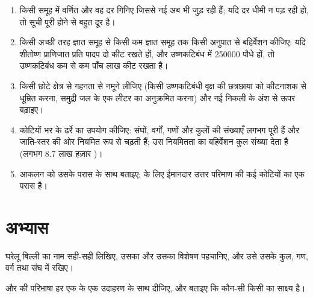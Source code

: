 \begin{method}\label{met:b1:classifying-biodiversity:estimate}
\begin{enumerate}
  \item किसी समूह में वर्णित  और वह दर गिनिए जिससे नई अब भी जुड़
        रही हैं; यदि दर धीमी न पड़ रही हो, तो सूची पूरी होने से बहुत
        दूर है।
  \item किसी अच्छी तरह ज्ञात समूह से किसी कम ज्ञात समूह तक किसी अनुपात
        से बहिर्वेशन कीजिए: यदि शीतोष्ण प्राणिजात प्रति पादप  दो
        कीट  रखते हों, और उष्णकटिबंध में \num{250000} पौधे हों,
        तो उष्णकटिबंध कम से कम पाँच लाख कीट रखता है।
  \item किसी छोटे क्षेत्र से गहनता से नमूने लीजिए (किसी उष्णकटिबंधी
        वृक्ष की छत्रछाया को कीटनाशक से धूम्रित करना, समुद्री जल के एक
        लीटर का  अनुक्रमित करना) और नई निकली  के अंश से ऊपर
        बढ़ाइए।
  \item कोटियों भर के ढर्रे का उपयोग कीजिए: संघों, वर्गों, गणों और कुलों
        की संख्याएँ लगभग पूरी हैं और जाति-स्तर की ओर नियमित रूप से
        चढ़ती हैं; उस नियमितता का बहिर्वेशन कुल संख्या देता है (लगभग
        \num{8.7} लाख हज़ार )।
  \item आकलन को उसके परास के साथ बताइए;  के लिए ईमानदार
        उत्तर परिमाण की कई कोटियों का एक परास है।
\end{enumerate}
\end{method}

\section{अभ्यास}

\begin{exercise}[$\star$]\label{exo:b1:classifying-biodiversity:1}
घरेलू बिल्ली का नाम सही-सही लिखिए, उसका  और उसका विशेषण पहचानिए, और
उसे उसके कुल, गण, वर्ग तथा संघ में रखिए।
\end{exercise}

\begin{exercise}[$\star$]\label{exo:b1:classifying-biodiversity:2}
 और  की परिभाषा हर एक के एक उदाहरण के साथ दीजिए, और
बताइए कि कौन-सी किसी  का साक्ष्य है।
\end{exercise}


